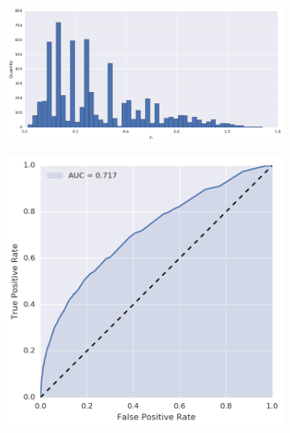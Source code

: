 \begin{figure}[!h]
\centering
\begin{subfigure}[t]{\textwidth}
	\centering
	\includegraphics[height=.175\textheight]{figures/bayes/least1/hist_contacts.png}
\end{subfigure}
\begin{subfigure}[b]{.49\textwidth}
	\raggedleft{}
	\includegraphics[height=.175\textheight]{figures/bayes/least1/roc_contacts.png}
\end{subfigure}
\begin{subfigure}[b]{.49\textwidth}
	\raggedright{}

\end{subfigure}
\end{figure}
